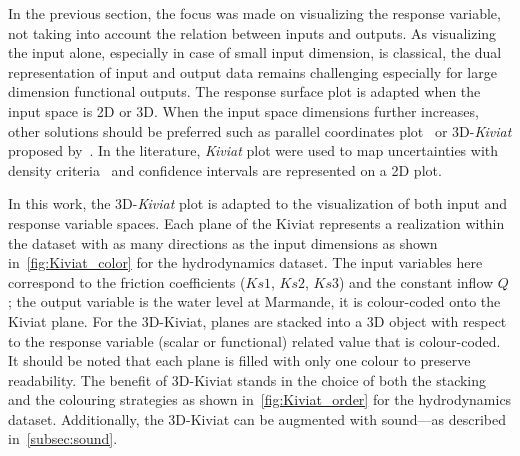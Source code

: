 In the previous section, the focus was made on visualizing the response variable, not taking into account the relation between inputs and outputs. As visualizing the input alone, especially in case of small input dimension, is classical, the dual representation of input and output data remains challenging especially for large dimension functional outputs. The response surface plot is adapted when the input space is 2D or 3D. When the input space dimensions further increases, other solutions should be preferred such as parallel coordinates plot~\cite{Inselberg1985,Inselberg2009} or 3D-\emph{Kiviat} proposed by~\citep{Hackstadt1994}. In the literature, \emph{Kiviat} plot were used to map uncertainties with density criteria~\citep{VanSomeren2016} and confidence intervals are represented on a 2D plot.

In this work, the 3D-\emph{Kiviat} plot is adapted to the visualization of both input and response variable spaces. Each plane of the Kiviat represents a realization within the dataset with as many directions as the input dimensions as shown in~\cref{fig:Kiviat_color} for the hydrodynamics dataset. The input variables here correspond to the friction coefficients ($Ks1$, $Ks2$, $Ks3$) and the constant inflow $Q$; the output variable is the water level at Marmande, it is colour-coded onto the Kiviat plane. For the 3D-Kiviat, planes are stacked into a 3D object with respect to the response variable (scalar or functional) related value that is colour-coded. It should be noted that each plane is filled with only one colour to preserve readability. The benefit of 3D-Kiviat stands in the choice of both the stacking and the colouring strategies as shown in~\cref{fig:Kiviat_order} for the hydrodynamics dataset. Additionally, the 3D-Kiviat can be augmented with sound---as described in~\cref{subsec:sound}.

